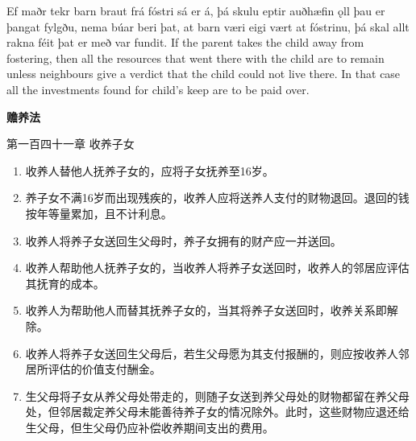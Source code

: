 \begin{paracol}{2}
    Ef maðr tekr barn braut frá fóstri sá er á, þá skulu eptir auðhæfin ǫll þau er þangat fylgðu, nema búar beri þat, at barn væri eigi vært at fóstrinu, þá skal allt rakna féit þat er með var fundit.
    \switchcolumn
    If the parent takes the child away from fostering, then all the resources that went there with the child are to remain unless neighbours give a verdict that the child could not live there. In that case all the investments found for child's keep are to be paid over.
\end{paracol}
\begin{translation*}{}
    \begin{center}
        \textbf{赡养法}

        第一百四十一章 \quad 收养子女
    \end{center}
    \AddEnumerateCounter{\chinese}{\chinese}{}
    \begin{enumerate}[label={\chinese*}、]
        \item 收养人替他人抚养子女的，应将子女抚养至16岁。

        \item 养子女不满16岁而出现残疾的，收养人应将送养人支付的财物退回。退回的钱按年等量累加，且不计利息。

        \item 收养人将养子女送回生父母时，养子女拥有的财产应一并送回。

        \item 收养人帮助他人抚养子女的，当收养人将养子女送回时，收养人的邻居应评估其抚育的成本。

        \item 收养人为帮助他人而替其抚养子女的，当其将养子女送回时，收养关系即解除。

        \item 收养人将养子女送回生父母后，若生父母愿为其支付报酬的，则应按收养人邻居所评估的价值支付酬金。

        \item 生父母将子女从养父母处带走的，则随子女送到养父母处的财物都留在养父母处，但邻居裁定养父母未能善待养子女的情况除外。此时，这些财物应退还给生父母，但生父母仍应补偿收养期间支出的费用。
    \end{enumerate}
\end{translation*}
